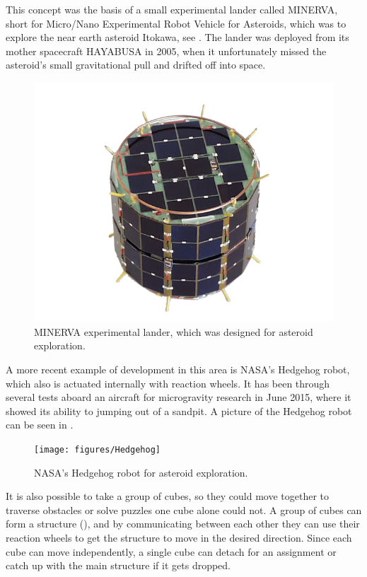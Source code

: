 This concept was the basis of a small experimental lander called MINERVA, short for Micro/Nano Experimental Robot Vehicle for Asteroids, which was to explore the near earth asteroid Itokawa, see . The lander was deployed from its mother spacecraft HAYABUSA in 2005, when it unfortunately missed the asteroid's small gravitational pull and drifted off into space.\cite{TYoshimitsu}
%
\begin{figure}[H] 
	\centering
	\includegraphics[scale=.7]{figures/MINERVA2}
	\caption{MINERVA experimental lander, which was designed for asteroid exploration.\cite{TYoshimitsu}}
	\label{MINERVA}
\end{figure}
%
A more recent example of development in this area is NASA's Hedgehog robot, which also is actuated internally with reaction wheels. It has been through several tests aboard an aircraft for microgravity research in June 2015, where it showed its ability to jumping out of a sandpit. A picture of the Hedgehog robot can be seen in . \cite{ELandau}
%
\begin{figure}[H] 
	\centering
	\texttt{[image: figures/Hedgehog]}
	\caption{NASA's Hedgehog robot for asteroid exploration.\cite{ELandau}}
	\label{Hedgehog}
\end{figure}
%
It is also possible to take a group of cubes, so they could move together to traverse obstacles or solve puzzles one cube alone could not. A group of cubes can form a structure (), and by communicating between each other they can use their reaction wheels to get the structure to move in the desired direction. Since each cube can move independently, a single cube can detach for an assignment or catch up with the main structure if it gets dropped.\cite{JRomanishin}
